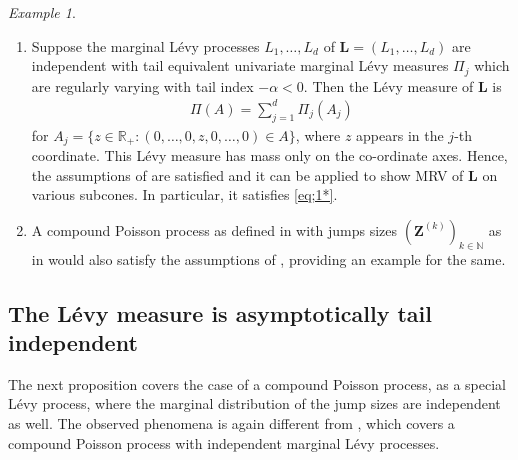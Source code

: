 \documentclass[aos]{imsart}
\numberwithin{equation}{section}
\theoremstyle{plain} %
\theoremstyle{remark}
\newtheorem{example}[theorem]{Example}
\newcommand{\beao}{\begin{eqnarray*}}
\newcommand{\eeao}{\end{eqnarray*}\noindent}
\newcommand{\N}{\mathbb{N}}
\newcommand{\R}{\mathbb{R}}
\newcommand{\VF}[1]{{\color{blue} #1}}
\def\bone{\boldsymbol 1}
\def\bZ{\boldsymbol Z}
\def\bL{\boldsymbol L}
\begin{document}
\begin{example} $\mbox{}$
\begin{enumerate}
\item[(a)] Suppose the marginal L\'evy processes $L_1,\ldots,L_d$ of $\bL=(L_1,\ldots,L_d)$
are independent with tail equivalent univariate marginal L\'evy measures $ \Pi_j $ which are regularly varying with tail index $-\alpha<0$. Then the L\'evy measure of $\bL$ is
\beao
    \Pi(A)=\sum_{j=1}^d\Pi_j(A_j)
\eeao
for $A_j=\{z\in\R_+:(0,\ldots,0,z,0,\ldots,0)\in A\}$, where $z$ appears in the $j$-th coordinate. This L\'evy measure 
has  mass only on the co-ordinate axes. %
Hence, the assumptions of  are satisfied and it can be applied to show MRV of $\bL$ on various subcones. {In particular, it satisfies \eqref{eq;1*}.}
\item[(b)]  A compound Poisson process as defined in  with  jumps sizes $(\bZ^{(k)})_{k\in\N}$ as in  would also satisfy the assumptions of , providing an example for the same.
\end{enumerate}
\end{example}

\subsection{The L\'evy measure is asymptotically tail independent}
The next proposition covers the case of a compound Poisson process, as a special L\'evy process, where the marginal distribution of the jump sizes 
are independent as well. The observed phenomena is again different from , which covers a compound Poisson process with independent marginal L\'evy processes. 

\end{document}
